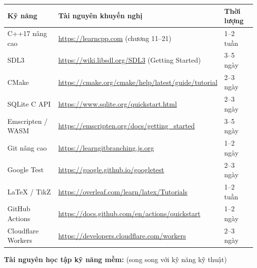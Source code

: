 \documentclass[12pt,a4paper]{article}
\begin{document}
\begin{tabularx}{\linewidth}{|l|X|l|}
\hline
\rowcolor{gray!20}
\textbf{Kỹ năng} & \textbf{Tài nguyên khuyến nghị} & \textbf{Thời lượng} \\
\hline
C++17 nâng cao & \url{https://learncpp.com} (chương 11--21) & 1--2 tuần \\
\hline
SDL3 & \url{https://wiki.libsdl.org/SDL3} (Getting Started) & 3--5 ngày \\
\hline
CMake & \url{https://cmake.org/cmake/help/latest/guide/tutorial} & 2--3 ngày \\
\hline
SQLite C API & \url{https://www.sqlite.org/quickstart.html} & 2--3 ngày \\
\hline
Emscripten / WASM & \url{https://emscripten.org/docs/getting_started} & 3--5 ngày \\
\hline
Git nâng cao & \url{https://learngitbranching.js.org} & 1--2 ngày \\
\hline
Google Test & \url{https://google.github.io/googletest} & 2--3 ngày \\
\hline
LaTeX / TikZ & \url{https://overleaf.com/learn/latex/Tutorials} & 1--2 tuần \\
\hline
GitHub Actions & \url{https://docs.github.com/en/actions/quickstart} & 1--2 ngày \\
\hline
Cloudflare Workers & \url{https://developers.cloudflare.com/workers} & 2--3 ngày \\
\hline
\end{tabularx}

\vspace{6pt}
\noindent\textbf{Tài nguyên học tập kỹ năng mềm:} (song song với kỹ năng kỹ thuật)
\end{document}
